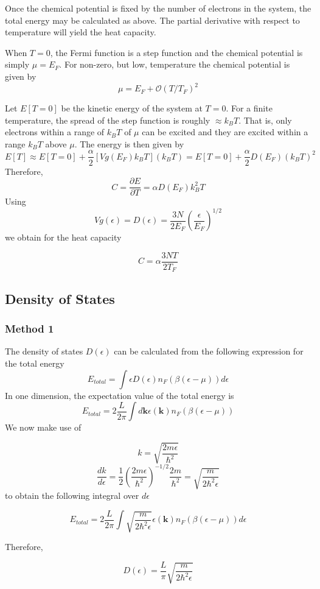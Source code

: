 \documentclass[10pt]{article}
\begin{document}
Once the chemical potential is fixed by the number of electrons in the system, the total energy may be calculated
as above. The partial derivative with respect to temperature will yield the heat capacity.

When $T = 0$, the Fermi function is a step function and the chemical potential is simply $\mu = E_{F}$.
For non-zero, but low, temperature the chemical potential is given by
$$\mu = E_{F} + \mathcal{O}(T/T_{F})^{2}$$

Let $E[T=0]$ be the kinetic energy of the system at $T=0$. For a finite temperature, the spread of the step function is roughly $\approx k_{B}T$.
That is, only electrons within a range of $k_{B}T$ of $\mu$ can be excited and they are excited within a range $k_{B}T$ above $\mu$.
The energy is then given by
$$E[T] \approx E[T=0] + \frac{\alpha}{2}[Vg(E_{F})k_{B}T](k_{B}T) = E[T=0] + \frac{\alpha}{2}D(E_{F})(k_{B}T)^{2}$$
Therefore,
$$
C = \frac{\partial E}{\partial T} = \alpha D(E_{F})k_{B}^{2}T
$$
Using
$$Vg(\epsilon) = D(\epsilon) = \frac{3N}{2E_{F}}\left ( \frac{\epsilon}{E_{F}}\right )^{1/2}$$
we obtain for the heat capacity

$$
C = \alpha \frac{3NT}{2T_{F}}
$$

\subsection{Density of States}

\subsubsection{Method 1}
The density of states $D(\epsilon)$ can be calculated from the following expression for the total energy
$$
E_{total} = \int \epsilon D(\epsilon) n_{F}(\beta(\epsilon - \mu)) d\epsilon
$$
In one dimension, the expectation value of the total energy is
$$E_{total} = 2\frac{L}{2\pi}\int d\textbf{k} \epsilon(\textbf{k}) n_{F}(\beta(\epsilon - \mu))  $$
We now make use of

$$
k = \sqrt{\frac{2m\epsilon}{\hbar^{2}}}
$$
$$
\frac{dk}{d\epsilon} = \frac{1}{2}\left ( \frac{2m\epsilon}{\hbar^{2}}\right )^{-1/2} \frac{2m}{\hbar^{2}} = \sqrt{\frac{m}{2\hbar^{2}\epsilon}}
$$
to obtain the following integral over $d\epsilon$

$$E_{total} = 2\frac{L}{2\pi}\int \sqrt{\frac{m}{2\hbar^{2}\epsilon}}\epsilon(\textbf{k}) n_{F}(\beta(\epsilon - \mu))  d\epsilon $$

Therefore,

$$D(\epsilon) = \frac{L}{\pi} \sqrt{\frac{m}{2\hbar^{2}\epsilon}}$$
\end{document}
